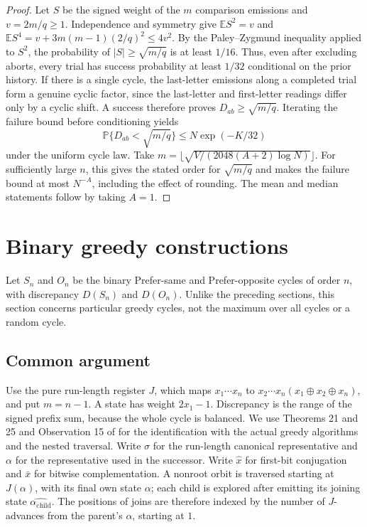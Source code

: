 \documentclass[11pt]{article}
\begin{document}
\begin{proof}
Let \(S\) be the signed weight of the \(m\) comparison emissions
and \(v=2m/q\ge1\). Independence and symmetry give
\(\mathbb E S^2=v\) and
\(\mathbb E S^4=v+3m(m-1)(2/q)^2\le4v^2\).
By the Paley--Zygmund inequality applied to \(S^2\),
the probability of \(|S|\ge\sqrt{m/q}\) is at least \(1/16\).
Thus, even after excluding aborts, every trial has success
probability at least \(1/32\) conditional on the prior history.
If there is a single cycle, the last-letter emissions along
a completed trial form a genuine cyclic factor, since the
last-letter and first-letter readings differ only by a cyclic
shift. A success therefore proves \(D_{ab}\ge\sqrt{m/q}\).
Iterating the failure bound before conditioning yields
\[
 {\mathbb P}\{D_{ab}<\sqrt{m/q}\}
 \le N\exp(-K/32)
\]
under the uniform cycle law. Take
\(m=\lfloor\sqrt{V/(2048(A+2)\log N)}\rfloor\).
For sufficiently large \(n\), this gives the stated order
for \(\sqrt{m/q}\) and makes the failure bound at most
\(N^{-A}\), including the effect of rounding. The mean and
median statements follow by taking \(A=1\).
\end{proof}

\section{Binary greedy constructions}\label{sec:greedy}
Let \(S_n\) and \(O_n\) be the binary Prefer-same and Prefer-opposite
cycles of order \(n\), with discrepancy \(D(S_n)\) and \(D(O_n)\).
Unlike the preceding sections, this section concerns particular
greedy cycles, not the maximum over all cycles or a random cycle.

\subsection{Common argument}
Use the pure run-length register \(J\), which maps
\(x_1\cdots x_n\) to \(x_2\cdots x_n(x_1\oplus x_2\oplus x_n)\),
and put \(m=n-1\). A state has weight \(2x_1-1\).
Discrepancy is the range of the signed prefix sum, because
the whole cycle is balanced. We use Theorems 21 and 25 and
Observation 15 of \cite{SalaSawadaAlhakim} for the identification with the
actual greedy algorithms and the nested traversal.
Write \(\sigma\) for the run-length canonical representative
and \(\alpha\) for the representative used in the successor.
Write \(\widehat{x}\) for first-bit conjugation and \(\bar x\)
for bitwise complementation. A nonroot orbit is traversed
starting at \(J(\alpha)\), with its final own state \(\alpha\);
each child is explored after emitting its joining state
\(\widehat{\alpha_{\mathrm{child}}}\). The positions of joins
are therefore indexed by the number of \(J\)-advances from
the parent's \(\alpha\), starting at \(1\).
\end{document}
